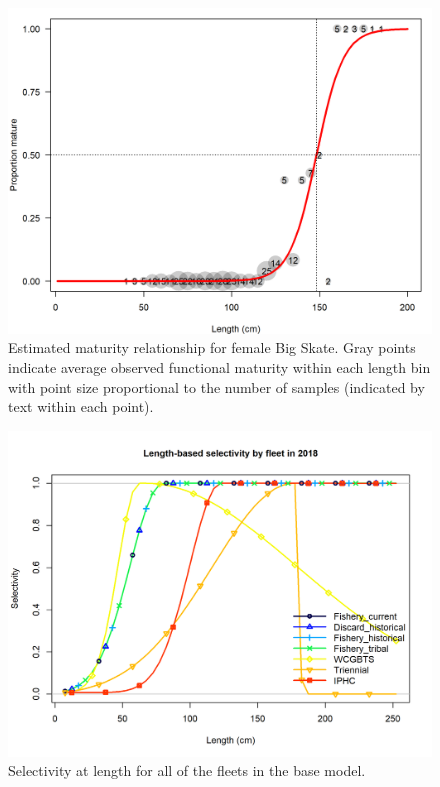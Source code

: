 \documentclass[12pt,]{article}
\begin{document}
\begin{figure}
\centering
\includegraphics{Figures/BigSkate_maturity.png}
\caption{Estimated maturity relationship for female Big Skate. Gray
points indicate average observed functional maturity within each length
bin with point size proportional to the number of samples (indicated by
text within each point).\label{fig:maturity}}
\end{figure}

\newpage

\FloatBarrier

\FloatBarrier

\FloatBarrier

\FloatBarrier

\begin{figure}
\centering
\includegraphics{r4ss/plots_mod1/sel01_multiple_fleets_length1.png}
\caption{Selectivity at length for all of the fleets in the base model.
\label{fig:sel01_multiple_fleets_length1}}
\end{figure}
\end{document}

